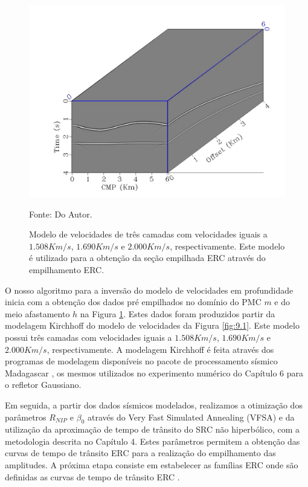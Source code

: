 \begin{figure}[H]
\caption{Modelo de velocidades de três camadas com velocidades iguais a $1.508Km/s$,
$1.690Km/s$ e $2.000Km/s$, respectivamente. Este modelo é utilizado para a obtenção da seção
empilhada ERC através do empilhamento ERC.}
\begin{center}
\includegraphics[scale=0.3]{images/datacube.jpeg}
\vspace{-0.3cm}
\end{center}
\begin{center}
 Fonte: Do Autor.
\end{center}
\label{fig:9.2}
\end{figure}

O nosso algoritmo para a inversão do modelo de velocidades em profundidade inicia com a obtenção dos dados
pré empilhados no domínio do PMC $m$ e do meio afastamento $h$ na Figura \ref{fig:9.2}. Estes dados foram
produzidos partir da modelagem Kirchhoff do modelo de velocidades
da Figura \ref{fig:9.1}. Este modelo possui três camadas com velocidades iguais a $1.508Km/s$,
$1.690Km/s$ e $2.000Km/s$, respectivamente. A modelagem Kirchhoff é feita através dos programas
de modelagem disponíveis no pacote de processamento sísmico Madagascar \cite{madagascar},
os mesmos utilizados no experimento numérico do Capítulo 6 para o refletor Gaussiano.

Em seguida, a partir dos dados sísmicos modelados, realizamos a otimização dos parâmetros $R_{NIP}$
e $\beta_0$ através do Very Fast Simulated Annealing (VFSA) e da utilização da aproximação de tempo
de trânsito do SRC não hiperbólico, com a metodologia descrita no Capítulo 4.
Estes parâmetros permitem a obtenção
das curvas de tempo de trânsito ERC para a realização do empilhamento das amplitudes. 
A próxima etapa consiste em estabelecer as famílias ERC onde são definidas as
curvas de tempo de trânsito ERC .

